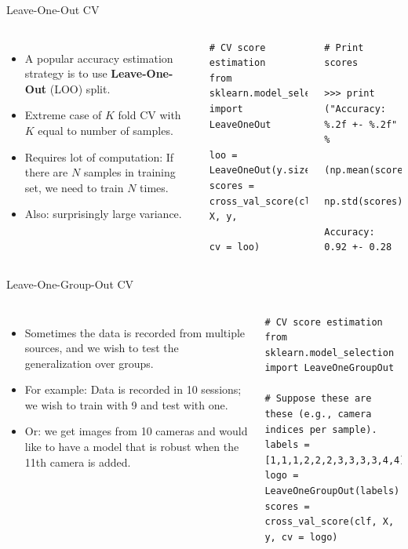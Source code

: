 \documentclass[10pt, aspectratio=169]{beamer} %
\begin{document}
\begin{frame}[fragile]{Leave-One-Out CV}
\begin{columns}
{\small\vspace*{-0.8cm}
\begin{itemize}
\item A popular accuracy estimation strategy is to use \textbf{Leave-One-Out} (LOO) split.
\item Extreme case of $K$ fold CV with $K$ equal to number of samples.
\item Requires lot of computation: If there are $N$ samples in training set, we need to 
train $N$ times.
\item Also: surprisingly large variance.
\end{itemize}
}
\begin{lstlisting}
# CV score estimation
from sklearn.model_selection import LeaveOneOut

loo = LeaveOneOut(y.size)
scores = cross_val_score(clf, X, y, 
                         cv = loo)

\end{lstlisting}
\begin{lstlisting}
# Print scores

>>> print ("Accuracy: %.2f +- %.2f" %
          (np.mean(scores), 
           np.std(scores)))

Accuracy: 0.92 +- 0.28
\end{lstlisting}
\end{columns}
\end{frame}

\begin{frame}[fragile]{Leave-One-Group-Out CV}
\begin{columns}
{\small\vspace*{-0.8cm}
\begin{itemize}
\item Sometimes the data is recorded from multiple sources, and we wish
to test the generalization over groups.
\item For example: Data is recorded in 10 sessions; we wish to train with 9 and test with one.
\item Or: we get images from 10 cameras and would like to have a model that is robust when the 11th
camera is added.
\end{itemize}
}
\begin{lstlisting}
# CV score estimation
from sklearn.model_selection import LeaveOneGroupOut

# Suppose these are these (e.g., camera indices per sample).
labels = [1,1,1,2,2,2,3,3,3,3,4,4] 
logo = LeaveOneGroupOut(labels)
scores = cross_val_score(clf, X, y, cv = logo)
\end{lstlisting}
\end{columns}
\end{frame}
\end{document}
